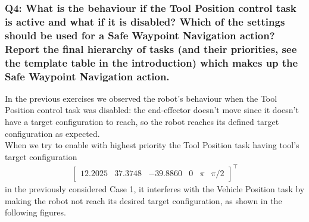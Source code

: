 \documentclass{article}
\begin{document}
\begin{figure}[H]
	\centering
	\hspace{10mm}
	\label{fig:q3case3cd}
\end{figure}


\subsubsection{Q4: What is the behaviour if the Tool Position control task is active and what if it is disabled? Which of the settings should be used for a Safe Waypoint Navigation action? Report the final hierarchy of tasks (and their priorities, see the template table in the introduction) which makes up the Safe Waypoint Navigation action.}
In the previous exercises we observed the robot's behaviour when the Tool Position control task was disabled: the end-effector doesn't move since it doesn't have a target configuration to reach, so the robot reaches its defined target configuration as expected. \\
When we try to enable with highest priority the Tool Position task having tool's target configuration
\begin{gather*}
	\begin{bmatrix} 12.2025 & 37.3748 & -39.8860 & 0 & \pi & \pi/2\end{bmatrix}^\top
\end{gather*}
in the previously considered Case 1, it interferes with the Vehicle Position task by making the robot not reach its desired target configuration, as shown in the following figures.
\end{document}

